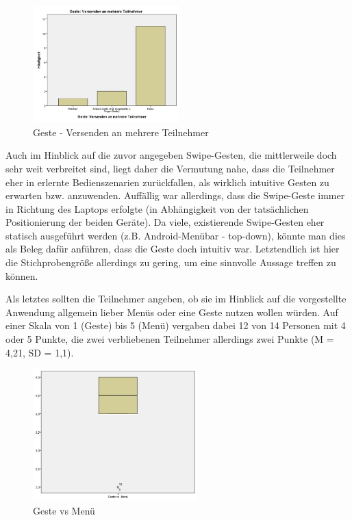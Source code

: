 \documentclass{chi-ext}
\begin{document}
\begin{figure}
  \centering
  \includegraphics[width=160pt]{img/studie/Antworten_Geste_Multicast.jpg}
  \caption{Geste - Versenden an mehrere Teilnehmer}
  \label{fig:studie_Antworten_Geste_Multicast}
\end{figure}


Auch im Hinblick auf die zuvor angegeben Swipe-Gesten, die mittlerweile doch sehr weit verbreitet sind, liegt daher die Vermutung nahe, dass die Teilnehmer eher in erlernte Bedienszenarien zurückfallen, als wirklich intuitive Gesten zu erwarten bzw. anzuwenden. Auffällig war allerdings, dass die Swipe-Geste immer in Richtung des Laptops erfolgte (in Abhängigkeit von der tatsächlichen Positionierung der beiden Geräte). Da viele, existierende Swipe-Gesten eher statisch ausgeführt werden (z.B. Android-Menübar - top-down), könnte man dies als Beleg dafür anführen, dass die Geste doch intuitiv war. Letztendlich ist hier die Stichprobengröße allerdings zu gering, um eine sinnvolle Aussage treffen zu können.

Als letztes sollten die Teilnehmer angeben, ob sie im Hinblick auf die vorgestellte Anwendung allgemein lieber Menüs oder eine Geste nutzen wollen würden. Auf einer Skala von 1 (Geste) bis 5 (Menü) vergaben dabei 12 von 14 Personen mit 4 oder 5 Punkte, die zwei verbliebenen Teilnehmer allerdings zwei Punkte (M = 4,21, SD = 1,1). 

\begin{figure}
  \centering
  \includegraphics[width=180pt]{img/studie/Geste_vs_Menu.jpg}
  \caption{Geste vs Menü}
  \label{fig:studie_Geste_vs_Menu}
\end{figure}
\end{document}
